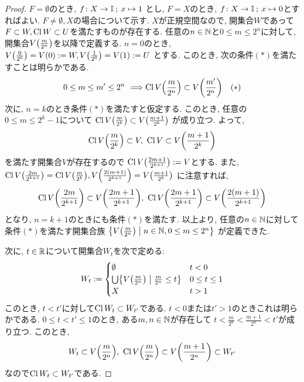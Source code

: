 \documentclass[uplatex, dvipdfmx, a4paper, 12pt, class=jsbook, crop=false]{standalone}
\begin{document}
\begin{proof}
	\( F = \emptyset \)のとき,
	\( f\colon X\to\mathbb{I}\mathpunct{\: ; \:} x\mapsto1 \)
	とし,
	\( F = X \)のとき,
	\( f\colon X\to\mathbb{I}\mathpunct{\: ; \:} x\mapsto0 \)とすればよい.
	\( F \neq \emptyset, X \)の場合について示す.
	\( X \)が正規空間なので, 開集合\( W \)であって
	\( F \subset W, \mathop{\mathrm{Cl}}\nolimits W \subset U \)を満たすものが存在する.
	任意の\( n \in \mathbb{N} \)と\( 0 \leq m \leq 2^n \)に対して,
	開集合\( V\lrparen{{\frac{m}{2^n}}} \)を以降で定義する.
	\( n = 0 \)のとき,
	\( V\lrparen{{\frac{0}{2^0}}}
	= V\lrparen{0}
	\defeq W,
	V\lrparen{{\frac{1}{2^0}}}
	= V\lrparen{1}
	\defeq U \)
	とする.
	このとき, 次の条件\( (\ast) \)を満たすことは明らかである.
	\[ 0 \leq m \leq m' \leq 2^n \ \Longrightarrow
	\topcl V\lrparen{\frac{m}{2^n}} \subset V\lrparen{\frac{m'}{2^n}} \ \ \ (\ast) \]
	次に, \( n = k \)のとき条件\( (\ast) \)を満たすと仮定する.
	このとき, 任意の\( 0 \leq m \leq 2^k - 1 \)について
	\( \topcl V\lrparen{\frac{m}{2^k}} \subset V\lrparen{\frac{m+1}{2^k}} \)
	が成り立つ.
	よって,
	\[ \topcl V\lrparen{\frac{m}{2^k}} \subset V, \
	\topcl V \subset V\lrparen{\frac{m+1}{2^k}} \]
	を満たす開集合$ V $が存在するので
	\( \topcl V\lrparen{\frac{2m+1}{2^{k+1}}} \defeq V \)とする.
	また, \( \topcl V\lrparen{\frac{2m}{2^{k+1}}}
	= \topcl V\lrparen{\frac{m}{2^k}},
	V\lrparen{\frac{2(m+1)}{2^{k+1}}} = V\lrparen{\frac{m+1}{2^k}} \)
	に注意すれば,
	\[ \topcl V\lrparen{\frac{2m}{2^{k+1}}} \subset V\lrparen{\frac{2m+1}{2^{k+1}}}, \
	\topcl V\lrparen{\frac{2m+1}{2^{k+1}}} \subset V\lrparen{\frac{2(m+1)}{2^{k+1}}} \]
	となり, \( n = k+1 \)のときにも条件\( (\ast) \)を満たす.
	以上より, 任意の\( n \in \mathbb{N} \)に対して
	条件\( (\ast) \)を満たす開集合族
	\( \setcomp{V\lrparen{\frac{m}{2^n}}}
	{n \in \N, 0 \leq m \leq 2^n} \)
	が定義できた.

	次に, \( t \in \mathbb{R} \)について開集合\( W_t \)を次で定める:
	\[ W_t \defeq \begin{cases}
		\emptyset & t < 0 \\
		\bigcup \setcomp{V\lrparen{\frac{m}{2^n}}}{\frac{m}{2^n} \leq t} & 0 \leq t \leq 1 \\
		X & t > 1
	\end{cases}\]
	このとき, \( t < t' \)に対して\( \mathop{\mathrm{Cl}}\nolimits W_t \subset W_{t'} \)である.
	\( t < 0 \)または\( t' > 1 \)のときこれは明らかである.
	\( 0 \leq t < t' \leq 1 \)のとき,
	ある\( m, n \in \mathbb{N} \)が存在して
	\( t < \frac{m}{2^n} < \frac{m+1}{2^n} < t' \)が成り立つ.
	このとき, \[ W_t \subset V\lrparen{\frac{m}{2^n}}, \
	\topcl V\lrparen{\frac{m}{2^n}} \subset V\lrparen{\frac{m+1}{2^n}} \subset W_{t'} \]
	なので\( \mathop{\mathrm{Cl}}\nolimits W_t \subset W_{t'} \)である.


\end{proof}
\end{document}
